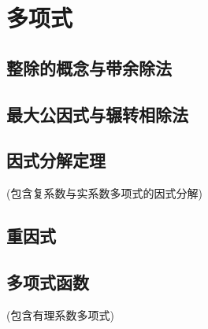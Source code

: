 
\section{多项式}
\label{sec:polynome}

\subsection{整除的概念与带余除法}
\label{sec:polynome-integer-division-and-devision-with-remainder}

\subsection{最大公因式与辗转相除法}
\label{sec:greatest-common-divisor-and-euclidean-division}

\subsection{因式分解定理}
\label{sec:factoring-theorem}

(包含复系数与实系数多项式的因式分解)

\subsection{重因式}
\label{sec:mulitple-factor}

\subsection{多项式函数}
\label{sec:polynome-function}

(包含有理系数多项式)




